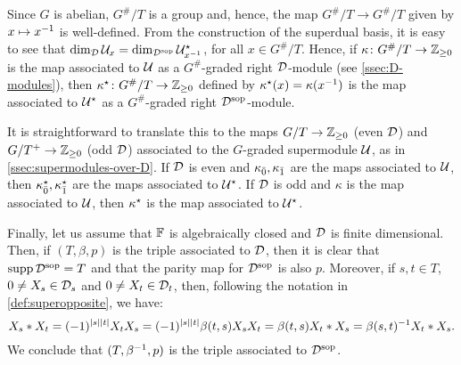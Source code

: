 Since $G$ is abelian, $G^\#/T$ is a group and, hence, the map $G^\#/T \to G^\#/T$ given by $x \mapsto x^{-1}$ is well-defined. 
From the construction of the superdual basis, it is easy to see that $\dim_{\mathcal{D}} \mathcal U_x = \dim_{\mathcal{D}^{\mathrm{sop}}} \mathcal U^\star_{x^{-1}}$, for all $x \in G^\#/T$. 
Hence, if $\kappa\colon G^\#/T \to \mathbb{Z}_{\geq 0}$ is the map associated to $\mathcal U$ as a $G^\#$-graded right $\mathcal{D}$-module (see \cref{ssec:D-modules}), then $\kappa^\star \colon G^\#/T \to \mathbb{Z}_{\geq 0}$ defined by $\kappa^\star (x) = \kappa (x^{-1})$ is the map associated to $\mathcal U^\star$ as a $G^\#$-graded right $\mathcal{D}^{\mathrm{sop}}$-module.

It is straightforward to translate this to the maps $G/T \to \mathbb{Z}_{\geq 0}$ (even $\mathcal{D}$) and $G/T^+ \to \mathbb{Z}_{\geq 0}$ (odd $\mathcal{D}$) associated to the $G$-graded supermodule $\mathcal U$, as in \cref{ssec:supermodules-over-D}. 
If $\mathcal{D}$ is even and $\kappa_{\bar{0}}, \kappa_{\bar{1}}$ are the maps associated to $\mathcal U$, then $\kappa_{\bar{0}}^\star, \kappa_{\bar{1}}^\star$ are the maps associated to $\mathcal U^\star$. 
If $\mathcal{D}$ is odd and $\kappa$ is the map associated to $\mathcal U$, then $\kappa^\star$ is the map associated to $\mathcal U^\star$.

Finally, let us assume that $\mathbb{F}$ is algebraically closed and $\mathcal{D}$ is finite dimensional. 
Then, if $(T, \beta, p)$ is the triple associated to $\mathcal{D}$, then it is clear that $\operatorname{supp} \mathcal{D}^{\mathrm{sop}} = T$ and that the parity map for $\mathcal{D}^{\mathrm{sop}}$ is also $p$. 
Moreover, if $s,t \in T$, $0 \neq X_s \in \mathcal{D}_s$ and $0 \neq X_t \in \mathcal{D}_t$, then, following the notation in \cref{def:superopposite}, we have:
\[
    X_s * X_t = (-1)^{|s||t|} X_tX_s = (-1)^{|s||t|} \beta(t, s) X_sX_t = \beta(t, s) X_t*X_s = \beta(s, t)^{-1} X_t*X_s.
\]
We conclude that $(T,\beta^{-1}, p)$ is the triple associated to $\mathcal{D}^{\mathrm{sop}}$.